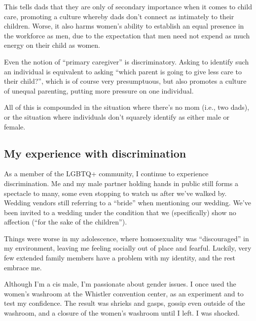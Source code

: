 \documentclass[]{article}
\begin{document}
This tells dads that they are only of secondary importance when it comes to child care, promoting a culture whereby dads don't connect as intimately to their children. Worse, it also harms women's ability to establish an equal presence in the workforce as men, due to the expectation that men need not expend as much energy on their child as women.

Even the notion of ``primary caregiver'' is discriminatory. Asking to identify such an individual is equivalent to asking ``which parent is going to give less care to their child?'', which is of course very presumptuous, but also promotes a culture of unequal parenting, putting more pressure on one individual.

All of this is compounded in the situation where there's no mom (i.e., two dads), or the situation where individuals don't squarely identify as either male or female.

\hypertarget{my-experience-with-discrimination}{%
\subsection{My experience with discrimination}\label{my-experience-with-discrimination}}

As a member of the LGBTQ+ community, I continue to experience discrimination. Me and my male partner holding hands in public still forms a spectacle to many, some even stopping to watch us after we've walked by. Wedding vendors still referring to a ``bride'' when mentioning our wedding. We've been invited to a wedding under the condition that we (specifically) show no affection (``for the sake of the children'').

Things were worse in my adolescence, where homosexuality was ``discouraged'' in my environment, leaving me feeling socially out of place and fearful. Luckily, very few extended family members have a problem with my identity, and the rest embrace me.

Although I'm a cis male, I'm passionate about gender issues. I once used the women's washroom at the Whistler convention center, as an experiment and to test my confidence. The result was shrieks and gasps, gossip even outside of the washroom, and a closure of the women's washroom until I left. I was shocked.
\end{document}
